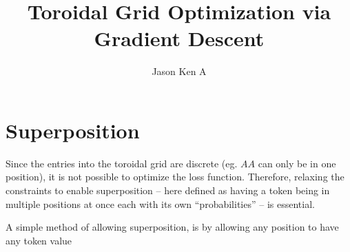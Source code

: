 \documentclass[a4paper]{article}
\title{Toroidal Grid Optimization via Gradient Descent}
\author{Jason Ken A}
\begin{document}
\maketitle
\tableofcontents


\section{Superposition}%
\label{sec:superposition}
Since the entries into the toroidal grid are discrete (eg. $AA$ can only be in one position), it is not possible to optimize the loss function. Therefore, relaxing the constraints to enable superposition -- here defined as having a token being in multiple positions at once each with its own ``probabilities'' -- is essential.

A simple method of allowing superposition, is by allowing any position to have any token value

\end{document}
